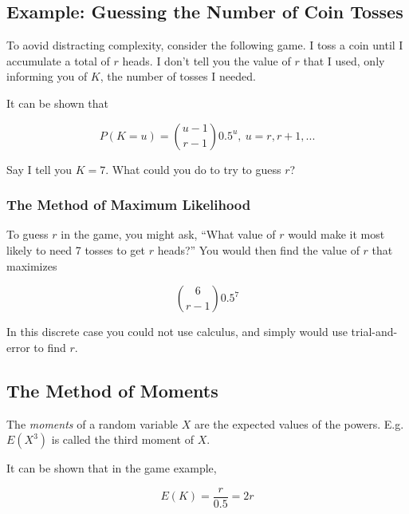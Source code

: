 \subsection{Example:  Guessing the Number of Coin Tosses}

To aovid distracting complexity, consider the following game.  I toss a
coin until I accumulate a total of $r$ heads.  I don't tell you the
value of $r$ that I used, only informing you of $K$, the number of
tosses I needed.

It can be shown that

\begin{equation}
P(K = u) = \binom{u-1}{r-1} 0.5^u,~ u = r, r+1, ...
\end{equation}

Say I tell you $K = 7$.  What could you do to try to guess  $r$?

\subsubsection{The Method of Maximum Likelihood}

To guess $r$ in the game, you might ask, ``What value of $r$ would make
it most likely to need 7 tosses to get $r$ heads?''  You would then find
the value of $r$ that maximizes

\begin{equation}
\label{negbin7}
\binom{6}{r-1} 0.5^7
\end{equation}

In this discrete case you could not use calculus, and simply would use
trial-and-error to find $r$.

\subsection{The Method of Moments}

The \textit{moments} of a random variable $X$ are the expected values of
the powers.  E.g. $E(X^{3})$ is called the third moment of $X$.

It can be shown that in the game example,

\begin{equation}
E(K) = \frac{r}{0.5} = 2r
\end{equation}



